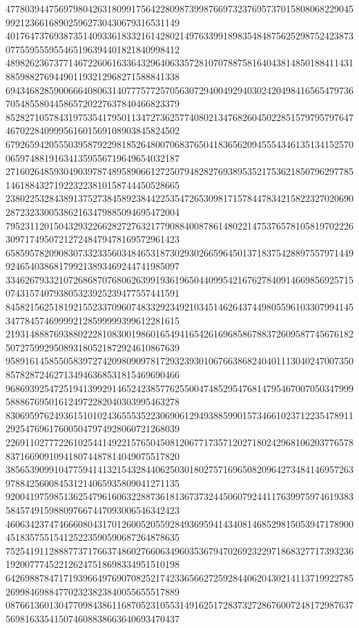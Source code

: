 \begin{DoxyCode}
      477803944756979804263180991756422809873998766973237695737015808068229045992123661689025962730430679316531149
      401764737693873514093361833216142802149763399189835484875625298752423873077559555955465196394401821840998412
      489826236737714672260616336432964063357281070788758164043814850188411431885988276944901193212968271588841338
      694346828590066640806314077757725705630729400492940302420498416565479736705485580445865720227637840466823379
      852827105784319753541795011347273625774080213476826045022851579795797647467022840999561601569108903845824502
      679265942055503958792298185264800706837650418365620945554346135134152570065974881916341359556719649654032187
      271602648593049039787489589066127250794828276938953521753621850796297785146188432719223223810158744450528665
      238022532843891375273845892384422535472653098171578447834215822327020690287232330053862163479885094695472004
      795231120150432932266282727632177908840087861480221475376578105819702226309717495072127248479478169572961423
      658595782090830733233560348465318730293026659645013718375428897557971449924654038681799213893469244741985097
      334626793321072686870768062639919361965044099542167627840914669856925715074315740793805323925239477557441591
      845821562518192155233709607483329234921034514626437449805596103307994145347784574699992128599999399612281615
      219314888769388022281083001986016549416542616968586788372609587745676182507275992950893180521872924610867639
      958916145855058397274209809097817293239301067663868240401113040247007350857828724627134946368531815469690466
      968693925472519413992914652423857762550047485295476814795467007050347999588867695016124972282040303995463278
      830695976249361510102436555352230690612949388599015734661023712235478911292547696176005047974928060721268039
      226911027772261025441492215765045081206771735712027180242968106203776578837166909109418074487814049075517820
      385653909910477594141321543284406250301802757169650820964273484146957263978842560084531214065935809041271135
      920041975985136254796160632288736181367373244506079244117639975974619383584574915988097667447093006546342423
      460634237474666080431701260052055928493695941434081468529815053947178900451835755154125223590590687264878635
      752541911288877371766374860276606349603536794702692322971868327717393236192007774522126247518698334951510198
      642698878471719396649769070825217423365662725928440620430214113719922785269984698847702323823840055655517889
      087661360130477098438611687052310553149162517283732728676007248172987637569816335415074608838663640693470437

\end{DoxyCode}
